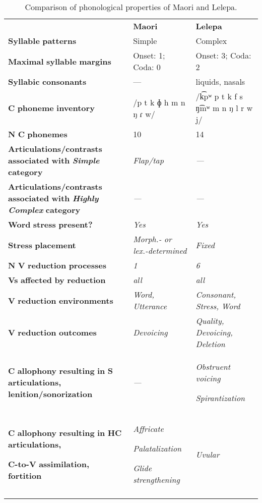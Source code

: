 \begin{table}
\begin{tabularx}{\textwidth}{XXX}
\lsptoprule
 & \textbf{Maori} & \textbf{Lelepa}\\
 \textbf{Syllable} \textbf{patterns} & Simple & Complex\\
 \textbf{Maximal} \textbf{syllable} \textbf{margins} & Onset: 1; Coda: 0 & Onset: 3; Coda: 2\\
 \textbf{Syllabic} \textbf{consonants} & — & liquids, nasals\\
 \textbf{C} \textbf{phoneme} \textbf{inventory} & /p t k ɸ h m n ŋ ɾ w/ & /k͡pʷ p t k f s ŋ͡mʷ m n ŋ l r w j/\\
 \textbf{N} \textbf{C} \textbf{phonemes} & 10 & 14\\
 \textbf{Articulations/contrasts} \textbf{associated} \textbf{with} \textbf{\textit{Simple}} \textbf{category} & \textit{Flap/tap} & \textit{—}\\
 \textbf{Articulations/contrasts} \textbf{associated} \textbf{with} \textbf{\textit{Highly} \textit{Complex}} \textbf{category} & \textit{—} & \textit{—}\\
 \textbf{Word} \textbf{stress} \textbf{present?} & \textit{Yes} & \textit{Yes}\\
 \textbf{Stress} \textbf{placement} & \textit{Morph.-} \textit{or} \textit{lex.-determined} & \textit{Fixed}\\
 \textbf{N} \textbf{V} \textbf{reduction} \textbf{processes} & \textit{1} & \textit{6}\\
 \textbf{Vs} \textbf{affected} \textbf{by} \textbf{reduction}  & \textit{all} & \textit{all}\\
 \textbf{V} \textbf{reduction} \textbf{environments} & \textit{Word,} \textit{Utterance} & \textit{Consonant,} \textit{Stress,} \textit{Word}\\
 \textbf{V} \textbf{reduction} \textbf{outcomes} & \textit{Devoicing} & \textit{Quality,} \textit{Devoicing,} \textit{Deletion}\\
 \textbf{C} \textbf{allophony} \textbf{resulting} \textbf{in} \textbf{S} \textbf{articulations,} \textbf{lenition/sonorization} & \textit{—} & { \textit{Obstruent} \textit{voicing}}

 \textit{Spirantization}\\
{ \textbf{C} \textbf{allophony} \textbf{resulting} \textbf{in} \textbf{HC} \textbf{articulations,} }

 \textbf{C-to-V} \textbf{assimilation,} \textbf{fortition} & { \textit{Affricate}}

{ \textit{Palatalization}}

 \textit{Glide} \textit{strengthening} & \textit{Uvular}\\
\lspbottomrule
\end{tabularx}
\caption{\label{8.7}Comparison of phonological properties of Maori and Lelepa.}
\end{table}




